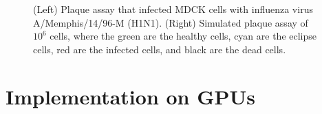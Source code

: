\begin{figure}[h]
    \centering

\caption{(Left) Plaque assay that infected MDCK cells with influenza virus A/Memphis/14/96-M (H1N1). (Right) Simulated plaque assay of $10^{6}$ cells, where the green are the healthy cells, cyan are the eclipse cells, red are the infected cells, and black are the dead cells. \label{fig_Plaques}}
\end{figure}

\section{Implementation on GPUs}

